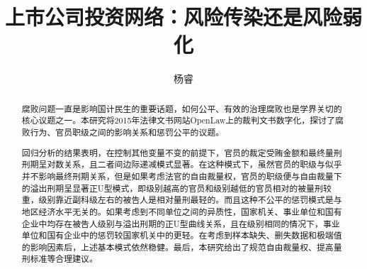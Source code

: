 \documentclass{SUIBEthesis}
\begin{document}
\title{上市公司投资网络：风险传染还是风险弱化}
\author{杨睿}


\maketitle

\newpage

\begin{abstract}
  腐败问题一直是影响国计民生的重要话题，如何公平、有效的治理腐败也是学界关切的核心议题之一。本研究将2015年法律文书网站OpenLaw上的裁判文书数字化，探讨了腐败行为、官员职级之间的影响关系和惩罚公平的议题。

  回归分析的结果表明，在控制其他变量不变的前提下，官员的裁定受贿金额和最终量刑刑期呈对数关系，且二者间边际递减模式显著。在这种模式下，虽然官员的职级与似乎并不影响最终刑期关系，但是如果考虑法官的自由裁量权，官员的职级便与自由裁量下的溢出刑期呈显著正U型模式，即级别越高的官员和级别越低的官员相对的被量刑较重，级别靠近副科级左右的被告人是相对量刑最轻的。而且这种不公平的惩罚模式是与地区经济水平无关的。如果考虑到不同单位之间的异质性，国家机关、事业单位和国有企业中均存在被告人级别与溢出刑期的正U型曲线关系，且在级别相同的情况下，事业单位和国有企业中的惩罚较国家机关中的更轻。在考虑到样本缺失、删失数据和极端值的影响因素后，上述基本模式依然稳健。最后，本研究给出了规范自由裁量权、提高量刑标准等合理建议。
\end{abstract}

\end{document}
